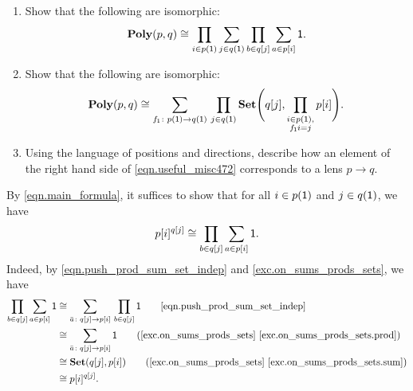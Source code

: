 \documentclass[Book-Poly]{subfiles}
\begin{document}
\begin{exercise}\label{exc.practice_sum_prod}
\begin{enumerate}
\item Show that the following are isomorphic:
\begin{equation}\label{eqn.poly_p_q}
  \mathbf{Poly}(p,q)
  \cong
  \prod_{i\in p(\textsf{1})}\sum_{j\in q(\textsf{1})}\prod_{b\in q[j]}\sum_{a\in p[i]}\textsf{1}.
\end{equation}
\item \label{exc.practice_sum_prod.useful} Show that the following are isomorphic:
	\begin{equation}\label{eqn.useful_misc472}
	\mathbf{Poly}(p,q)\cong\sum_{f_{\textsf{1}}\colon p(\textsf{1})\to q(\textsf{1})}\,\prod_{j\in q(\textsf{1})}\mathbf{Set}\Bigg(q[j],\prod_{\substack{i \in p(\textsf{1}), \\ f_{\textsf{1}}i = j}}p[i]\Bigg).
	\end{equation}
\item Using the language of positions and directions, describe how an element of the right hand side of \eqref{eqn.useful_misc472} corresponds to a lens $p\to q$.
\qedhere
\end{enumerate}
\begin{solution}
\begin{longenum}
\item By \eqref{eqn.main_formula}, it suffices to show that for all $i\in p(\textsf{1})$ and $j\in q(\textsf{1})$, we have
\[
    p[i]^{q[j]} \cong \prod_{b\in q[j]}\sum_{a\in p[i]}\textsf{1}.
\]
Indeed, by \eqref{eqn.push_prod_sum_set_indep} and \cref{exc.on_sums_prods_sets}, we have
\begin{align*}
    \prod_{b \in q[j]} \sum_{a \in p[i]} \1 &\iso \sum_{\bar{a} \colon q[j] \to p[i]} \, \prod_{b \in q[j]} \1 \tag*{\eqref{eqn.push_prod_sum_set_indep}} \\
    &\iso \sum_{\bar{a} \colon q[j] \to p[i]} \1 \tag{\cref{exc.on_sums_prods_sets} \cref{exc.on_sums_prods_sets.prod}} \\
    &\iso \smset(q[j], p[i]) \tag{\cref{exc.on_sums_prods_sets} \cref{exc.on_sums_prods_sets.sum}} \\
    &\iso p[i]^{q[j]}.
\end{align*}


\end{longenum}
\end{solution}
\end{exercise}
\end{document}
